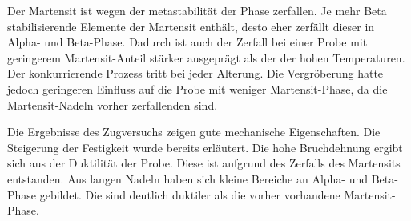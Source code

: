 \documentclass[a4paper, 11pt]{tubsreprt}
\begin{document}
Der Martensit ist wegen der metastabilität der Phase zerfallen. Je mehr Beta stabilisierende Elemente der Martensit enthält, desto eher zerfällt dieser in Alpha- und Beta-Phase. Dadurch ist auch der Zerfall bei einer Probe mit geringerem Martensit-Anteil stärker ausgeprägt als der der hohen Temperaturen. Der konkurrierende Prozess tritt bei jeder Alterung. Die Vergröberung hatte jedoch geringeren Einfluss auf die Probe mit weniger Martensit-Phase, da die Martensit-Nadeln vorher zerfallenden sind. 


Die Ergebnisse des Zugversuchs zeigen gute mechanische Eigenschaften. Die Steigerung der Festigkeit wurde bereits erläutert. Die hohe Bruchdehnung ergibt sich aus der Duktilität der Probe. Diese ist aufgrund des Zerfalls des Martensits entstanden. Aus langen Nadeln haben sich kleine Bereiche an Alpha- und Beta-Phase gebildet. Die sind deutlich duktiler als die vorher vorhandene Martensit-Phase.


\listoffigures
\listoftables
\end{document}
